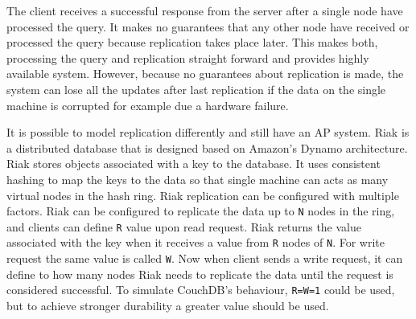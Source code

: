 The client receives a successful response from the server after a single node
have processed the query. It makes no guarantees that any other node have
received or processed the query because replication takes place later. This
makes both, processing the query and replication straight forward and provides
highly available system. However, because no guarantees about replication is
made, the system can lose all the updates after last replication if the data on
the single machine is corrupted for example due a hardware failure.

It is possible to model replication differently and still have an AP system.
Riak is a distributed database that is designed based on Amazon's Dynamo
architecture\cite{decandia2007dynamo}. Riak stores objects associated with a key
to the database. It uses consistent hashing\cite{karger1997consistent} to map
the keys to the data so that single machine can acts as many virtual nodes in
the hash ring. Riak replication can be configured with multiple factors. Riak
can be configured to replicate the data up to \texttt{N} nodes in the ring, and
clients can define \texttt{R} value upon read request. Riak returns the value
associated with the key when it receives a value from \texttt{R} nodes of
\texttt{N}. For write request the same value is called \texttt{W}. Now when
client sends a write request, it can define to how many nodes Riak needs to
replicate the data until the request is considered successful. To simulate
CouchDB's behaviour, \texttt{R=W=1} could be used, but to achieve stronger
durability a greater value should be used.

